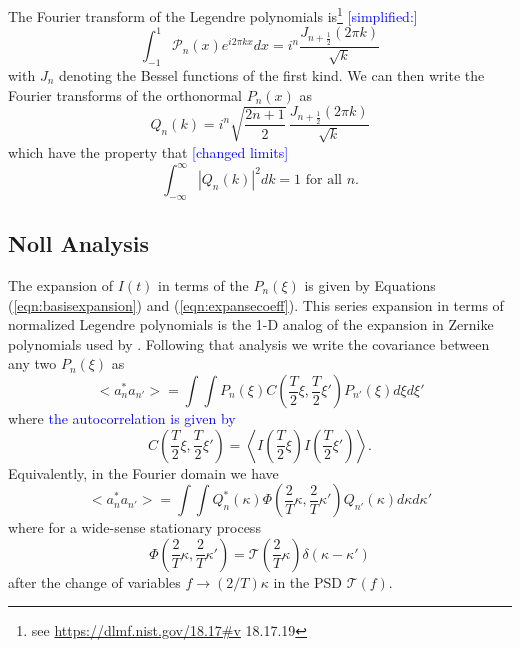 \documentclass[10pt,preprint]{aastex631}
\newcommand{\jrmadd}[1]{\textcolor{blue}{#1}}
\begin{document}
The Fourier transform of the Legendre polynomials is\footnote{see \url{https://dlmf.nist.gov/18.17\#v} 18.17.19} \jrmadd{[simplified:]}
\begin{equation}
\int_{-1}^{1} \mathscr{P}_n(x) e^{i2\pi k x} dx  =  i^n \frac{J_{n+\frac{1}{2}}(2\pi k)}{\sqrt{k}}
\end{equation}
with $J_n$ denoting the Bessel functions of the first kind.  We can then write the Fourier transforms of the orthonormal $P_n(x)$ as 
\begin{equation}
Q_n(k) = i^n \sqrt{\frac{2n+1}{2}}\, \frac{J_{n+\frac{1}{2}}(2\pi k)}{\sqrt{k}}
\end{equation}
which have the property that \jrmadd{[changed limits]}
\begin{equation}
\int_{-\infty}^\infty \left| Q_n(k) \right|^2 dk = 1 \mbox{ for all }n.
\end{equation}

\subsection{Noll Analysis}

The expansion of $I(t)$ in terms of the $P_n(\xi)$ is given by Equations (\ref{eqn:basisexpansion}) and (\ref{eqn:expansecoeff}).  This series expansion in terms of normalized Legendre polynomials is the 1-D analog of the expansion in Zernike polynomials used by \citet{1976JOSA...66..207N}.  Following that analysis we write the covariance between any two $P_n(\xi)$ as
\begin{equation}
<a_n^* a_{n'}> = \int \int P_n(\xi) C\left(\frac{T}{2}\xi, \frac{T}{2}\xi' \right) P_{n'}(\xi) d\xi d\xi' 
\end{equation}
where \jrmadd{the autocorrelation is given by}
\begin{equation}
C\left(\frac{T}{2}\xi, \frac{T}{2}\xi' \right) = \left<I\left(\frac{T}{2}\xi\right)I\left(\frac{T}{2}\xi'\right) \right>.
\end{equation}
Equivalently, in the Fourier domain we have
\begin{equation}
<a_n^* a_{n'}> = \int \int Q_n^*(\kappa) \Phi \left(\frac{2}{T}\kappa, \frac{2}{T}\kappa' \right) Q_{n'}(\kappa) d\kappa d\kappa' 
\end{equation}
where for a wide-sense stationary process
\begin{equation}
\Phi \left(\frac{2}{T}\kappa, \frac{2}{T}\kappa' \right) =  \mathcal{T}\left(\frac{2}{T}\kappa \right) \delta(\kappa-\kappa')
\end{equation}
after the change of variables $f \rightarrow (2/T)\kappa$ in the PSD $\mathcal{T}(f)$.
\end{document}
